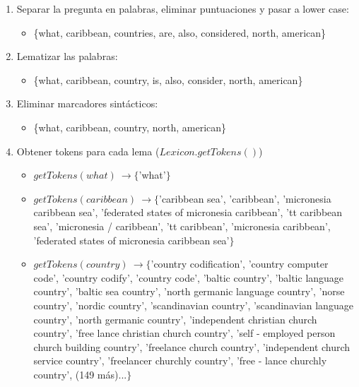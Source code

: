 \begin{enumerate}
  \item Separar la pregunta en palabras, eliminar puntuaciones y pasar a lower case:
  \begin{itemize}
    \item \{what, caribbean, countries, are, also, considered, north, american\}
  \end{itemize}
  \item Lematizar las palabras:
  \begin{itemize}
    \item \{what, caribbean, country, is, also, consider, north, american\}
  \end{itemize}
  \item Eliminar marcadores sintácticos:
  \begin{itemize}
    \item \{what, caribbean, country, north, american\}
  \end{itemize}
  \item Obtener tokens para cada lema ($Lexicon.getTokens()$)
  \begin{itemize}
    \item $getTokens(what)\ \rightarrow \{$'what'$\}$
    \item $getTokens(caribbean)\ \rightarrow \{$'caribbean sea', 'caribbean', 'micronesia caribbean sea', 'federated states of micronesia caribbean', 'tt caribbean sea', 'micronesia / caribbean', 'tt caribbean', 'micronesia caribbean', 'federated states of micronesia caribbean sea'$\}$
    \item $getTokens(country)\ \rightarrow  \{$'country codification', 'country computer code', 'country codify', 'country code', 'baltic country', 'baltic language country', 'baltic sea country', 'north germanic language country', 'norse country', 'nordic country', 'scandinavian country', 'scandinavian language country', 'north germanic country', 'independent christian church country', 'free lance christian church country', 'self - employed person church building country', 'freelance church country', 'independent church service country', 'freelancer churchly country', 'free - lance churchly country', (149 más)...$\}$

\end{itemize}
\end{enumerate}
